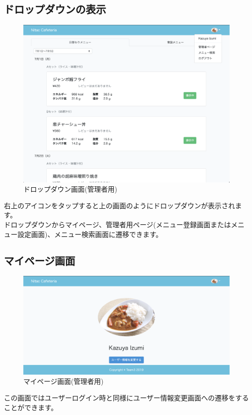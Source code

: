 \documentclass[a4paper]{jsarticle}
\begin{document}
\subsection{ドロップダウンの表示}
\begin{figure}[htbp]
	\centering
	\includegraphics[scale = 0.225]{image/dropdown_admin.png}
	\caption{ドロップダウン画面(管理者用)}
	\end{figure}
	右上のアイコンをタップすると上の画面のようにドロップダウンが表示されます。\\
	ドロップダウンからマイページ、管理者用ページ(メニュー登録画面またはメニュー設定画面)、メニュー検索画面に遷移できます。\\
\newpage
\subsection{マイページ画面}
\begin{figure}[htbp]
	\centering
	\includegraphics[scale = 0.225]{image/mypage_admin.png}
	\caption{マイページ画面(管理者用)}
	\end{figure}
	この画面ではユーザーログイン時と同様にユーザー情報変更画面への遷移をすることができます。
\end{document}
